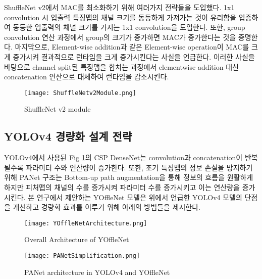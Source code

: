 \documentclass[10pt,twocolumn,letterpaper]{article}
\begin{document}
ShuffleNet v2에서 MAC를 최소화하기 위해 여러가지 전략들을 도입했다. 1x1 convolution 시 입출력 특징맵의 채널 크기를 동등하게 가져가는 것이 유리함을 입증하여 동등한 입출력의 채널 크기를 가지는 1x1 convolution을 도입한다. 또한, group convolution 연산 과정에서 group의 크기가 증가하면 MAC가 증가한다는 것을 증명한다. 마지막으로, Element-wise addition과 같은 Element-wise operation이 MAC를 크게 증가시켜 결과적으로 런타임을 크게 증가시킨다는 사실을 언급한다. 이러한 사실을 바탕으로 channel split된 특징맵을 합치는 과정에서 elementwise addition 대신 concatenation 연산으로 대체하여 런타임을 감소시킨다.

\begin{figure}[t]
    \captionsetup{singlelinecheck = false, format= hang, justification=raggedright, labelsep=space}
    \centering
        \texttt{[image: ShuffleNetv2Module.png]}
    \caption{ShuffleNet v2 module}
    \label{ShuffleNetv2Module}
\end{figure}

\vspace{.25cm}
\subsection{YOLOv4 경량화 설계 전략}
YOLOv4에서 사용된 Fig \ref{ShuffleNetv2Module}의 CSP DenseNet는 convolution과 concatenation이 반복될수록 파라미터 수와 연산량이 증가한다. 또한, 초기 특징맵의 정보 손실을 방지하기 위해 PANet 구조는 Bottom-up path augmentation을 통해 정보의 흐름을 원활하게 하지만 피처맵의 채널의 수를 증가시켜 파라미터 수를 증가시키고 이는 연산량을 증가시킨다. 본 연구에서 제안하는 YOffleNet 모델은 위에서 언급한 YOLOv4 모델의 단점을 개선하고 경량화 효과를 이루기 위해 아래의 방법들을 제시한다.

\begin{figure*}[t]
    \captionsetup{singlelinecheck = false, format= hang, justification=raggedright, labelsep=space}
    \centering
        \texttt{[image: YOffleNetArchitecture.png]}
    \caption{Overall Architecture of YOffleNet}
    \label{YOffleNetArchitecture}
\end{figure*}

\begin{figure}[t]
    \captionsetup{singlelinecheck = false, format= hang, justification=raggedright, labelsep=space}
    \centering
        \texttt{[image: PANetSimplification.png]}
    \caption{PANet architecture in YOLOv4 and YOffleNet}
    \label{PANetSimplification}
\end{figure}
\end{document}
